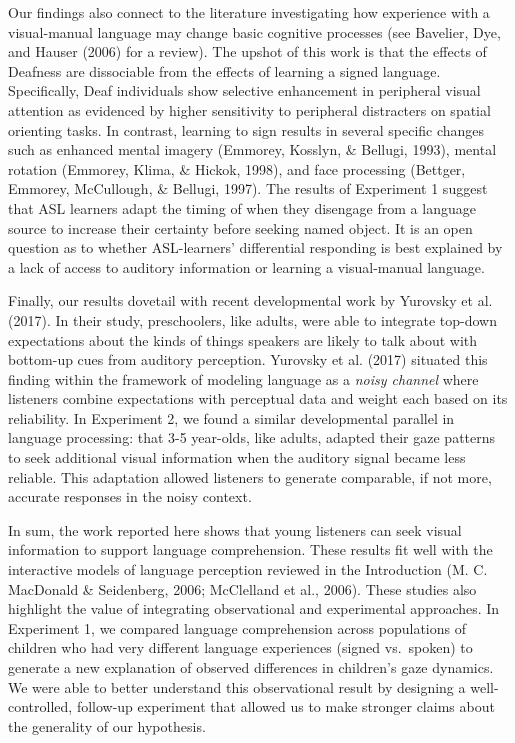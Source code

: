 \documentclass[,man,floatsintext]{apa6}
\begin{document}
Our findings also connect to the literature investigating how experience
with a visual-manual language may change basic cognitive processes (see
Bavelier, Dye, and Hauser (2006) for a review). The upshot of this work
is that the effects of Deafness are dissociable from the effects of
learning a signed language. Specifically, Deaf individuals show
selective enhancement in peripheral visual attention as evidenced by
higher sensitivity to peripheral distracters on spatial orienting tasks.
In contrast, learning to sign results in several specific changes such
as enhanced mental imagery (Emmorey, Kosslyn, \& Bellugi, 1993), mental
rotation (Emmorey, Klima, \& Hickok, 1998), and face processing
(Bettger, Emmorey, McCullough, \& Bellugi, 1997). The results of
Experiment 1 suggest that ASL learners adapt the timing of when they
disengage from a language source to increase their certainty before
seeking named object. It is an open question as to whether ASL-learners'
differential responding is best explained by a lack of access to
auditory information or learning a visual-manual language.

Finally, our results dovetail with recent developmental work by Yurovsky
et al. (2017). In their study, preschoolers, like adults, were able to
integrate top-down expectations about the kinds of things speakers are
likely to talk about with bottom-up cues from auditory perception.
Yurovsky et al. (2017) situated this finding within the framework of
modeling language as a \emph{noisy channel} where listeners combine
expectations with perceptual data and weight each based on its
reliability. In Experiment 2, we found a similar developmental parallel
in language processing: that 3-5 year-olds, like adults, adapted their
gaze patterns to seek additional visual information when the auditory
signal became less reliable. This adaptation allowed listeners to
generate comparable, if not more, accurate responses in the noisy
context.

In sum, the work reported here shows that young listeners can seek
visual information to support language comprehension. These results fit
well with the interactive models of language perception reviewed in the
Introduction (M. C. MacDonald \& Seidenberg, 2006; McClelland et al.,
2006). These studies also highlight the value of integrating
observational and experimental approaches. In Experiment 1, we compared
language comprehension across populations of children who had very
different language experiences (signed vs.~spoken) to generate a new
explanation of observed differences in children's gaze dynamics. We were
able to better understand this observational result by designing a
well-controlled, follow-up experiment that allowed us to make stronger
claims about the generality of our hypothesis.
\end{document}
